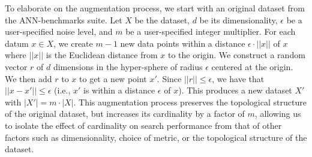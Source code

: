 To elaborate on the augmentation process, we start with an original dataset from the ANN-benchmarks suite.
Let $X$ be the dataset, $d$ be its dimensionality, $\epsilon$ be a user-specified noise level, and $m$ be a user-specified integer multiplier.
For each datum $x \in X$, we create $m - 1$ new data points within a distance $\epsilon \cdot ||x||$ of $x$ where $||x||$ is the Euclidean distance from $x$ to the origin.
We construct a random vector $r$ of $d$ dimensions in the hyper-sphere of radius $\epsilon$ centered at the origin.
We then add $r$ to $x$ to get a new point $x'$.
Since $||r|| \leq \epsilon$, we have that $||x - x'|| \leq \epsilon$ (i.e., $x'$ is within a distance $\epsilon$ of $x$).
This produces a new dataset $X'$ with $|X'| = m \cdot |X|$.
This augmentation process preserves the topological structure of the original dataset, but increases its cardinality by a factor of $m$, allowing us to isolate the effect of cardinality on search performance from that of other factors such as dimensionality, choice of metric, or the topological structure of the dataset.
